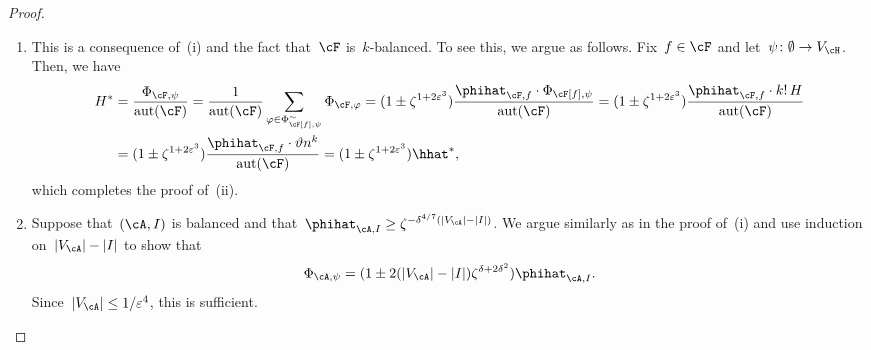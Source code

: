 \documentclass[11pt]{amsart}
\newcommand{\eps}{\varepsilon}
\DeclarePairedDelimiter{\paren}{\lparen}{\rparen}
\DeclarePairedDelimiter{\abs}{\lvert}{\rvert}
\renewcommand{\theta}{\vartheta}
\def\phi{\varphi}
\DeclareMathOperator{\aut}{aut}
\theoremstyle{definition}
\numberwithin{equation}{section}
\begin{document}
\begin{proof}
\begin{enumerate}[label=\textup{(\roman*)}, topsep=0pt, wide]
			Let us turn to the details.
			The template~$(\cA,U)$ is strictly balanced and satisfies~$\rho_{\cA,U}\leq\rho_\cF$, so since~$\cH$ is~$(\eps^4,\delta,\rho_\cF)$-pseudorandom, for all~$\phi\in\Phi_{\cA[U],\psi}^\sim$, we have
			\begin{equation*}
				\Phi_{\cA,\phi}
				=(1\pm\zeta_0)\phihat_{\cA,U}
				=\paren[\bigg]{1\pm \frac{n^{\delta}}{n^{\eps^2}}\zeta}\phihat_{\cA,U}
				=(1\pm \zeta^{1+3\eps^3})\phihat_{\cA,U}.
			\end{equation*}
			Since by induction hypothesis, we have~$\Phi_{\cA[U],\psi}=(1\pm 2(\abs{U}-\abs{I})\zeta^{1+3\eps^3})\phihat_{\cA[U],I}$, returning to~\eqref{equation: initial sparse templates split}, we conclude that
			\begin{equation*}
				\Phi_{\cA,\psi}
				=(1\pm 2(\abs{U}-\abs{I})\zeta^{1+3\eps^3})\phihat_{\cA[U],I}\cdot (1\pm \zeta^{1+3\eps^3})\phihat_{\cA,U}
				=(1\pm 2(\abs{V_\cA}-\abs{I})\zeta^{1+3\eps^3})\phihat_{\cA,I},
			\end{equation*}
			which completes the proof of~(i).
			
			\item This is a consequence of~(i) and the fact that~$\cF$ is~$k$-balanced.
			To see this, we argue as follows.
			Fix~$f\in\cF$ and let~$\psi\colon \emptyset\to V_\cH$.
			Then, we have
			\begin{equation*}
				\begin{aligned}
					H^*
					&=\frac{\Phi_{\cF,\psi}}{\aut(\cF)}
					=\frac{1}{\aut(\cF)}\sum_{\phi\in \Phi^\sim_{\cF[f],\psi}}\Phi_{\cF,\phi}
					=(1\pm \zeta^{1+2\eps^3})\frac{\phihat_{\cF,f}\cdot\Phi_{\cF[f],\psi}}{\aut(\cF)}
					=(1\pm \zeta^{1+2\eps^3})\frac{\phihat_{\cF,f}\cdot k!\,H}{\aut(\cF)}\\
					&=(1\pm \zeta^{1+2\eps^3})\frac{\phihat_{\cF,f}\cdot\theta n^k}{\aut(\cF)}
					=(1\pm \zeta^{1+2\eps^3})\hhat^*,
				\end{aligned}
			\end{equation*}
			which completes the proof of~(ii).
			
			\item Suppose that~$(\cA,I)$ is balanced and that~$\phihat_{\cA,I}\geq \zeta^{-\delta^{4/7}(\abs{V_\cA}-\abs{I})}$.
			We argue similarly as in the proof of~(i) and use induction on~$\abs{V_\cA}-\abs{I}$ to show that
			\begin{equation}\label{equation: initial balanced templates induction}
				\Phi_{\cA,\psi}=(1\pm 2(\abs{V_\cA}-\abs{I})\zeta^{\delta+2\delta^2})\phihat_{\cA,I}.
			\end{equation}
			Since~$\abs{V_\cA}\leq 1/\eps^4$, this is sufficient.
			

\end{enumerate}
\end{proof}
\end{document}
